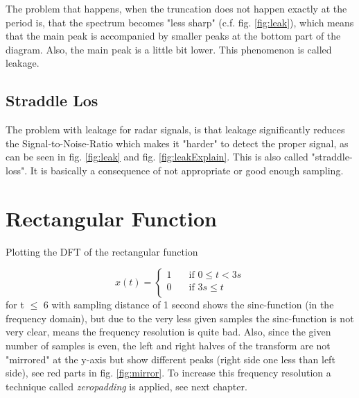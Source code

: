 \documentclass[12pt]{article}
\begin{document}
The problem that happens, when the truncation does not happen exactly at the period is, that the spectrum becomes "less sharp" (c.f. fig. \ref{fig:leak}), which means that the main peak is accompanied by smaller peaks at the bottom part of the diagram. Also, the main peak is a little bit lower. This phenomenon is called leakage.

\subsection{Straddle Los}
The problem with leakage for radar signals, is that leakage significantly reduces the Signal-to-Noise-Ratio which makes it "harder" to detect the proper signal, as can be seen in fig. \ref{fig:leak} and fig. \ref{fig:leakExplain}. This is also called "straddle-loss". It is basically a consequence of not appropriate or good enough sampling.

%
%


\addtocounter{section}{1}

\addtocounter{section}{1}

\section{Rectangular Function}
\label{rect}
Plotting the DFT of the rectangular function

\[ x(t) =
  \begin{cases}
    1       & \quad \text{if }  0 \leq t < 3s \\
    0  		& \quad \text{if }  3s \leq t \\
  \end{cases}
\]
for t $\leq$ 6 with sampling distance of 1 second  shows  the sinc-function (in the frequency domain), but due to the very less given samples the sinc-function is not very clear, means the frequency resolution is quite bad. Also, since the given number of samples is even, the left and right halves of the transform are not "mirrored" at the y-axis but show different peaks (right side one less than left side), see red parts in fig. \ref{fig:mirror}. To increase this frequency resolution a technique called \textit{zeropadding} is applied, see next chapter.
\end{document}
